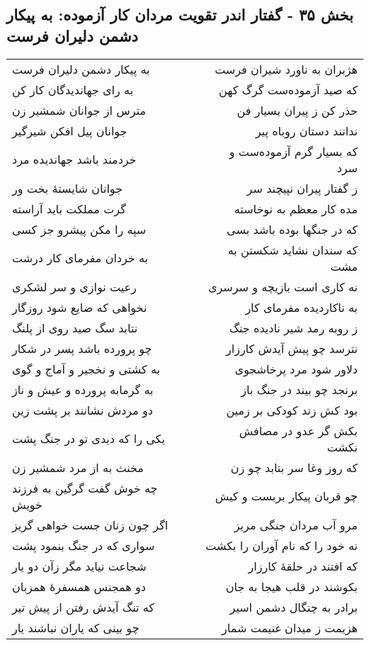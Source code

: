 \begin{center}
\section*{بخش ۳۵ - گفتار اندر تقویت مردان کار آزموده: به پیکار دشمن دلیران فرست}
\label{sec:035}
\begin{longtable}{l p{0.5cm} r}
به پیکار دشمن دلیران فرست
&&
هژبران به ناورد شیران فرست
\\
به رای جهاندیدگان کار کن
&&
که صید آزموده‌ست گرگ کهن
\\
مترس از جوانان شمشیر زن
&&
حذر کن ز پیران بسیار فن
\\
جوانان پیل افکن شیرگیر
&&
ندانند دستان روباه پیر
\\
خردمند باشد جهاندیده مرد
&&
که بسیار گرم آزموده‌ست و سرد
\\
جوانان شایستهٔ بخت ور
&&
ز گفتار پیران نپیچند سر
\\
گرت مملکت باید آراسته
&&
مده کار معظم به نوخاسته
\\
سپه را مکن پیشرو جز کسی
&&
که در جنگها بوده باشد بسی
\\
به خردان مفرمای کار درشت
&&
که سندان نشاید شکستن به مشت
\\
رعیت نوازی و سر لشکری
&&
نه کاری است بازیچه و سرسری
\\
نخواهی که ضایع شود روزگار
&&
به ناکاردیده مفرمای کار
\\
نتابد سگ صید روی از پلنگ
&&
ز روبه رمد شیر نادیده جنگ
\\
چو پرورده باشد پسر در شکار
&&
نترسد چو پیش آیدش کارزار
\\
به کشتی و نخجیر و آماج و گوی
&&
دلاور شود مرد پرخاشجوی
\\
به گرمابه پرورده و عیش و ناز
&&
برنجد چو بیند در جنگ باز
\\
دو مردش نشانند بر پشت زین
&&
بود کش زند کودکی بر زمین
\\
یکی را که دیدی تو در جنگ پشت
&&
بکش گر عدو در مصافش نکشت
\\
مخنث به از مرد شمشیر زن
&&
که روز وغا سر بتابد چو زن
\\
چه خوش گفت گرگین به فرزند خویش
&&
چو قربان پیکار بربست و کیش
\\
اگر چون زنان جست خواهی گریز
&&
مرو آب مردان جنگی مریز
\\
سواری که در جنگ بنمود پشت
&&
نه خود را که نام آوران را بکشت
\\
شجاعت نیاید مگر زآن دو یار
&&
که افتند در حلقهٔ کارزار
\\
دو همجنس همسفرهٔ همزبان
&&
بکوشند در قلب هیجا به جان
\\
که تنگ آیدش رفتن از پیش تیر
&&
برادر به چنگال دشمن اسیر
\\
چو بینی که یاران نباشند یار
&&
هزیمت ز میدان غنیمت شمار
\\
\end{longtable}
\end{center}
